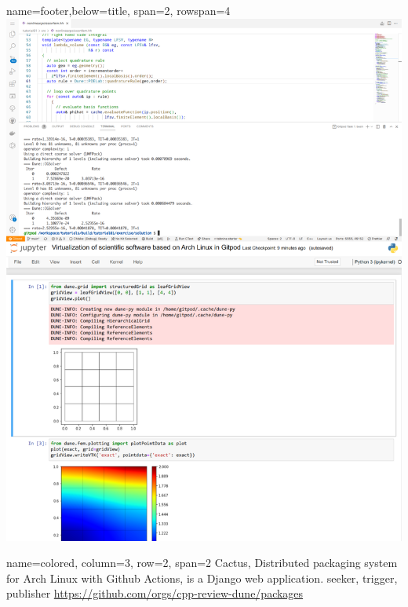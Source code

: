 \documentclass[
	paper=a0,
	style=ruled, %
	]{bfhsciposter}
\begin{document}
\begin{tcbposter}[
		poster={
				columns=4,
				rows=7,
				spacing=1cm,
			},]
	\begin{posterboxenv}[title=Tutorials available on Gitpod]{name=footer,below=title, span=2, rowspan=4}
		\includegraphics[width=\linewidth]{gitpod_dune}
	\end{posterboxenv}

	\begin{posterboxenv}[title=C++ Review DUNE meets Arch4edu, BFH-framed]{name=colored, column=3, row=2, span=2}
		Cactus, Distributed packaging system for Arch Linux with Github Actions, is a Django web application.
		seeker, trigger, publisher
		\url{https://github.com/orgs/cpp-review-dune/packages}
	\end{posterboxenv}


\end{tcbposter}
\end{document}
